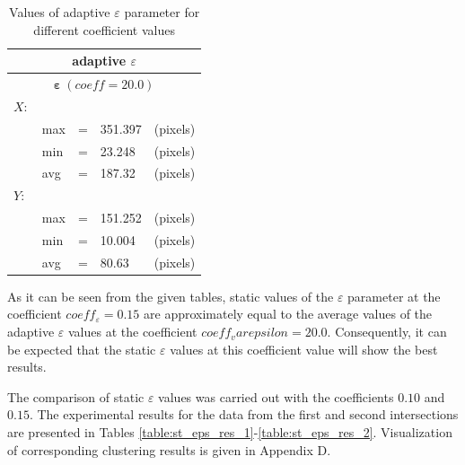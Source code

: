 \begin{table}[!htb]
	\caption{Values of adaptive $\varepsilon$ parameter for different coefficient values}
	\label{table:eps_adapt}
	
	\setlength{\tabcolsep}{10pt}
	\centering
	
	\begin{tabular}{||lllll||}
		\multicolumn{5}{c}{adaptive $\varepsilon$} \\
		\hline
		\multicolumn{5}{||c||}{$\bm{\varepsilon}\ (coeff = 20.0)$}\\
		$X:$       			& & & & \\[0.5ex]
		& max 	& = 	& 351.397 	& (pixels) \\[0.5ex]
		& min 	& = 	& 23.248 	& (pixels) \\[0.5ex]
		& avg 	& = 	& 187.32 	& (pixels) \\[0.5ex]
		$Y:$       			& & & & \\[0.5ex]
		& max 	& = 	& 151.252 	& (pixels) \\[0.5ex]
		& min 	& = 	& 10.004 	& (pixels) \\[0.5ex]
		& avg 	& = 	& 80.63 	& (pixels) \\[0.5ex]
		\hline
	\end{tabular}
\end{table}

As it can be seen from the given tables, static values of the $\varepsilon$ parameter at the coefficient $coeff_\varepsilon = 0.15$ are approximately equal to the average values of the adaptive $\varepsilon$ values at the coefficient $coeff_varepsilon = 20.0$. Consequently, it can be expected that the static $\varepsilon$ values ​​at this coefficient value will show the best results.

The comparison of static $\varepsilon$ values was carried out with the coefficients $0.10$ and $0.15$. The experimental results for the data from the first and second intersections are presented in Tables \ref{table:st_eps_res_1}-\ref{table:st_eps_res_2}. Visualization of corresponding clustering results is given in Appendix D.


